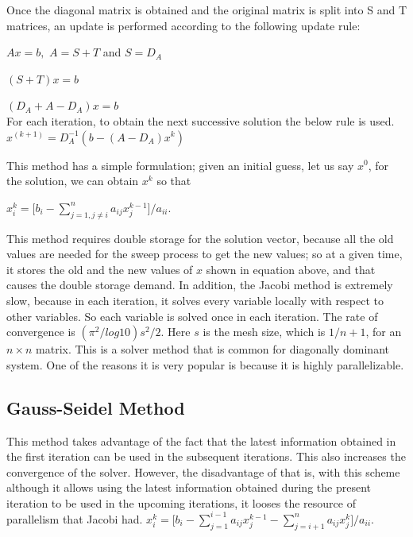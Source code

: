 Once the diagonal matrix is obtained and the original matrix is split into S and T matrices, an update is performed according to the following update rule:
\begin{center}
$Ax = b,$ $A = S+T$ and $S = D_{A}$

$(S + T)x = b$

$(D_{A} + A-D_{A})x = b$ \\
For each iteration, to obtain the next successive solution the below rule is used.
$x^{(k+1)}=D^{-1}_{A}(b -(A-D_{A}) x^{k})$
\end{center}

This method has a simple formulation; given an initial guess, let us say $x^{0}$, for the solution, we can obtain $x^{k}$ so that
\begin{center}
$x^{k}_{i} = \lbrack b_{i} - \sum_{j = 1, j \neq i}^{n} a_{ij}x^{k-1}_{j} \rbrack / a_{ii}$. 
\end{center}
This method requires double storage for the solution vector, because all the old values are needed for the sweep process to get the new values; so at a given time, it stores the old and the new values of $x$ shown in equation above, and that causes the double storage demand. In addition, the Jacobi method is extremely slow, because in each iteration, it solves every variable locally with respect to other variables. So each variable is solved once in each iteration. The rate of convergence is $ (\pi^{2} /log 10) s^2 /2 $.
Here $s$ is the mesh size, which is $1/n+1$, for an $n \times n$ matrix.
This is a solver method that is common for diagonally dominant system. One of the reasons it is very popular is because it is highly parallelizable.

\subsection{ Gauss-Seidel Method}
This method takes advantage of the fact that the latest information obtained in the first iteration can be used in the subsequent iterations. This also increases the convergence of the solver. However, the disadvantage of that is, with this scheme although it allows using the latest information obtained during the present iteration to be used in the upcoming iterations, it looses the resource of parallelism that Jacobi had. 
$x^{k}_{i} = \lbrack b_{i} - \sum_{j = 1}^{i-1} a_{ij}x^{k-1}_{j} - \sum_{j = i+1}^{n} a_{ij}x^k_{j} \rbrack / a_{ii}$. 

